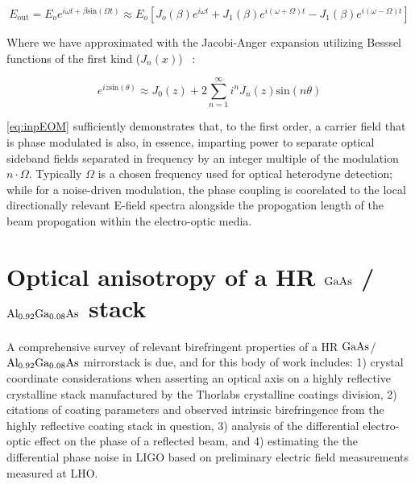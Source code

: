 
\begin{equation}\label{eq:inpEOM}
	E_\mathrm{out} = E_o e^{i \omega t + \beta \mathrm{sin}( \Omega t)} \approx E_o [J_o(\beta)e^{i \omega t} + J_1(\beta) e^{i(\omega + \Omega)t} - J_1(\beta) e^{i(\omega - \Omega)t}]  
\end{equation}

\noindent Where we have approximated with the Jacobi-Anger expansion utilizing Besssel functions of the first kind ($J_n(x)$) ~\cite{oliver:1972}:

\begin{equation}\label{eq:jacobianger}
	e^{iz \mathrm{sin}(\theta)} \approx J_0(z) + 2 \sum_{n=1}^{\infty} i^n J_n(z) \mathrm{sin} (n \theta)
\end{equation}

\ref{eq:inpEOM} sufficiently demonstrates that, to the first order, a carrier field that is phase modulated is also, in essence, imparting power to separate optical sideband fields separated in frequency by an integer multiple of the modulation $n \cdot \Omega$. Typically $\Omega$ is a chosen frequency used for optical heterodyne detection; while for a noise-driven modulation, the phase coupling is coorelated to the local directionally relevant E-field spectra alongside the propogation length of the beam propogation within the electro-optic media.

\section{Optical anisotropy of a HR \texorpdfstring{$\mathrm{GaAs}$}{gaas} / \texorpdfstring{$\mathrm{Al_{0.92}Ga_{0.08}As}$}{algaas} stack}
A comprehensive survey of relevant birefringent properties of a HR $\mathrm{GaAs}$/$\mathrm{Al_{0.92}Ga_{0.08}As}$ mirrorstack is due, and for this body of work includes: 1) crystal coordinate considerations when asserting an optical axis on a highly reflective crystalline stack manufactured by the Thorlabs crystalline coatings division, 2) citations of coating parameters and observed intrinsic birefringence from the highly reflective coating stack in question, 3) analysis of the differential electro-optic effect on the phase of a reflected beam, and 4) estimating the the differential phase noise in LIGO based on preliminary electric field measurements measured at LHO.

